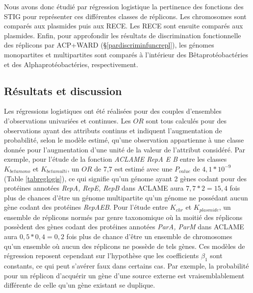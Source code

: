 	Nous avons donc étudié par régression logistique la pertinence des fonctions des STIG pour représenter ces différentes classes de réplicons. Les chromosomes sont comparés aux plasmides puis aux RECE. Les RECE sont ensuite comparés aux plasmides. Enfin, pour approfondir les résultats de discrimination fonctionnelle des réplicons par ACP+WARD (\S \ref{pardiscriminfuncrepl}), les génomes monopartites et multipartites sont comparés à l'intérieur des Bêtaprotéobactéries et des Alphaprotéobactéries, respectivement.
		
\subsection{Résultats et discussion}\label{reglogresult}
Les régressions logistiques ont été réalisées pour des couples d'ensembles d'observations univariées et continues. Les $OR$ sont tous calculés pour des observations ayant des attributs continus et indiquent l'augmentation de probabilité, selon le modèle estimé, qu'une observation appartienne à une classe donnée pour l'augmentation d'une unité de la valeur de l'attribut considéré. Par exemple, pour l'étude de la fonction \textit{ACLAME RepA E B} entre les classes $K_{betamono}$ et $K_{betamulti}$, un $OR$ de 7,7 est estimé avec une $P_{value}$ de $4,1 * 10^{-9}$ (Table \ref{tabreglogis}), ce qui signifie qu'un génome ayant 2 gènes codant pour des protéines annotées \textit{RepA, RepE, RepB} dans ACLAME aura $7,7 * 2=15,4$ fois plus de chances d'être un génome multipartite qu'un génome ne possédant aucun gène codant des protéines \textit{RepAEB}. Pour l'étude entre $K_{chr}$ et $K_{plasmide}$, un ensemble de réplicons normés par genre taxonomique où la moitié des réplicons possèdent des gènes codant des protéines annotées \textit{ParA, ParM} dans ACLAME aura $0,5 * 0,4 = 0,2$ fois plus de chance d'être un ensemble de chromosomes qu'un ensemble où aucun des réplicons ne possède de tels gènes. Ces modèles de régression reposent cependant sur l'hypothèse que les coefficients $\beta_{1}$ sont constants, ce qui peut s'avérer faux dans certains cas. Par exemple, la probabilité pour un réplicon d’acquérir un gène d'une source externe est vraisemblablement différente de celle qu'un gène existant se duplique.

